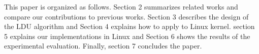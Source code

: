 


%
%
This paper is organized as follows. 
Section 2 summarizes related works and compare our contributions to previous
works. 
Section 3 describes the design of the LDU algorithm and 
Section 4 explains how to apply to Linux kernel.
section 5 explains our implementations in Linux and
Section 6 shows the results of the experimental evaluation. 
Finally, section 7 concludes the paper.



%
%







